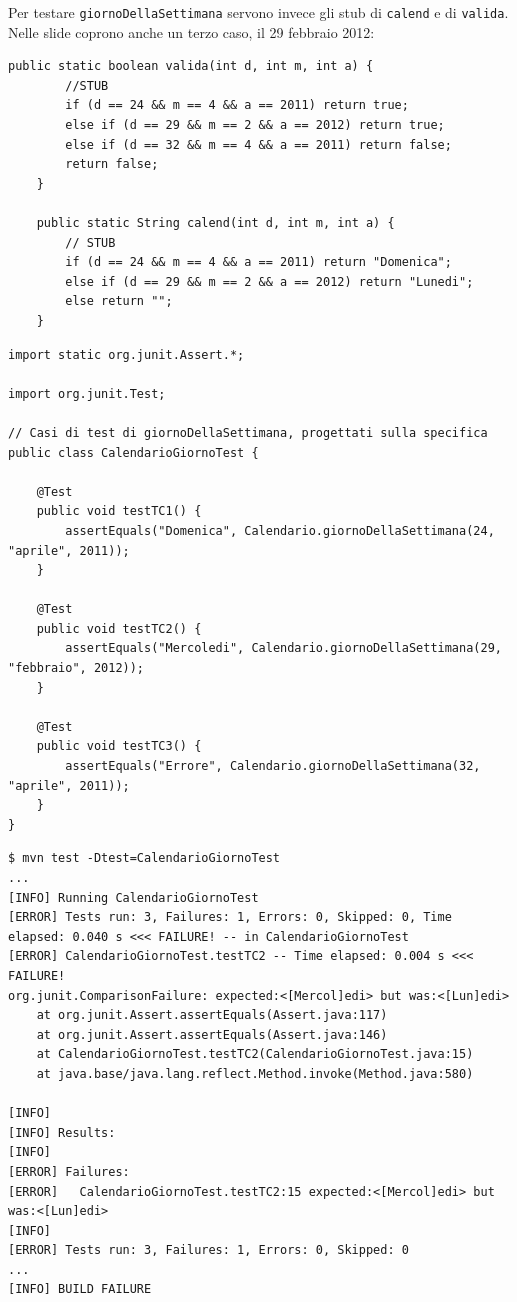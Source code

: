Per testare \texttt{giornoDellaSettimana} servono invece gli stub di \texttt{calend} e di \texttt{valida}. Nelle slide
coprono anche un terzo caso, il 29 febbraio 2012:

\begin{lstlisting}[style=java, name=Calendario.java, firstnumber=36]
    public static boolean valida(int d, int m, int a) {
        //STUB
        if (d == 24 && m == 4 && a == 2011) return true;
        else if (d == 29 && m == 2 && a == 2012) return true;
        else if (d == 32 && m == 4 && a == 2011) return false;
        return false;
    }

    public static String calend(int d, int m, int a) {
        // STUB
        if (d == 24 && m == 4 && a == 2011) return "Domenica";
        else if (d == 29 && m == 2 && a == 2012) return "Lunedi";
        else return "";
    }
\end{lstlisting}

\begin{lstlisting}[style=java, name=CalendarioGiornoTest.java]
import static org.junit.Assert.*;

import org.junit.Test;

// Casi di test di giornoDellaSettimana, progettati sulla specifica
public class CalendarioGiornoTest {

    @Test
    public void testTC1() {
        assertEquals("Domenica", Calendario.giornoDellaSettimana(24, "aprile", 2011));
    }

    @Test
    public void testTC2() {
        assertEquals("Mercoledi", Calendario.giornoDellaSettimana(29, "febbraio", 2012));
    }

    @Test
    public void testTC3() {
        assertEquals("Errore", Calendario.giornoDellaSettimana(32, "aprile", 2011));
    }
}
\end{lstlisting}

\begin{lstlisting}[style=shell, name=Terminale, deletekeywords={java}]
$ mvn test -Dtest=CalendarioGiornoTest
...
[INFO] Running CalendarioGiornoTest
[ERROR] Tests run: 3, Failures: 1, Errors: 0, Skipped: 0, Time elapsed: 0.040 s <<< FAILURE! -- in CalendarioGiornoTest
[ERROR] CalendarioGiornoTest.testTC2 -- Time elapsed: 0.004 s <<< FAILURE!
org.junit.ComparisonFailure: expected:<[Mercol]edi> but was:<[Lun]edi>
    at org.junit.Assert.assertEquals(Assert.java:117)
    at org.junit.Assert.assertEquals(Assert.java:146)
    at CalendarioGiornoTest.testTC2(CalendarioGiornoTest.java:15)
    at java.base/java.lang.reflect.Method.invoke(Method.java:580)

[INFO]
[INFO] Results:
[INFO]
[ERROR] Failures:
[ERROR]   CalendarioGiornoTest.testTC2:15 expected:<[Mercol]edi> but was:<[Lun]edi>
[INFO]
[ERROR] Tests run: 3, Failures: 1, Errors: 0, Skipped: 0
...
[INFO] BUILD FAILURE
\end{lstlisting}

